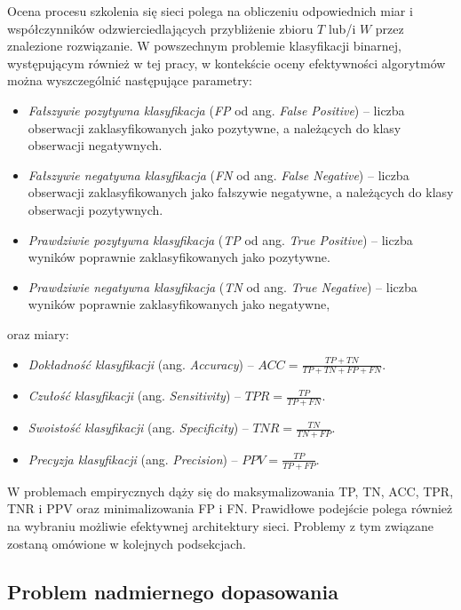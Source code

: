 Ocena procesu szkolenia się sieci polega na obliczeniu odpowiednich miar i współczynników odzwierciedlających przybliżenie zbioru $T$ lub/i $W$ przez znalezione rozwiązanie. W powszechnym problemie klasyfikacji binarnej, występującym również w tej pracy, w kontekście oceny efektywności algorytmów można wyszczególnić następujące parametry:
\begin{itemize}
	\item \textit{Fałszywie pozytywna klasyfikacja} (\textit{FP} od ang. \textit{False Positive}) -- liczba obserwacji zaklasyfikowanych jako pozytywne, a należących do klasy obserwacji negatywnych.
	\item \textit{Fałszywie negatywna klasyfikacja} (\textit{FN} od ang. \textit{False Negative}) -- liczba obserwacji zaklasyfikowanych jako fałszywie negatywne, a należących do klasy obserwacji pozytywnych. 
	\item \textit{Prawdziwie pozytywna klasyfikacja} (\textit{TP} od ang. \textit{True Positive}) -- liczba wyników poprawnie zaklasyfikowanych jako pozytywne. 
	\item \textit{Prawdziwie negatywna klasyfikacja} (\textit{TN} od ang. \textit{True Negative}) -- liczba wyników poprawnie zaklasyfikowanych jako negatywne,
\end{itemize}
oraz miary:
\begin{itemize}
	\item \textit{Dokładność klasyfikacji} (ang. \textit{Accuracy}) -- $ACC = \frac{TP + TN}{TP+TN+FP+FN}$.
	\item \textit{Czułość klasyfikacji} (ang. \textit{Sensitivity}) -- $TPR = \frac{TP}{TP + FN}$.
	\item \textit{Swoistość klasyfikacji} (ang. \textit{Specificity}) -- $TNR = \frac{TN}{TN + FP}$.
	\item \textit{Precyzja klasyfikacji} (ang. \textit{Precision}) -- $PPV = \frac{TP}{TP + FP}$.
\end{itemize}

W problemach empirycznych dąży się do maksymalizowania TP, TN, ACC, TPR, TNR i PPV oraz minimalizowania FP i FN. Prawidłowe podejście polega również na wybraniu możliwie efektywnej architektury sieci. Problemy z tym związane zostaną omówione w kolejnych podsekcjach.

\subsection{Problem nadmiernego dopasowania}
\label{sec-overffiting}


